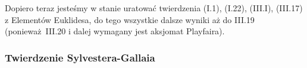 Dopiero teraz jesteśmy w stanie uratować twierdzenia (I.1), (I.22), (III.I), (III.17) z Elementów Euklidesa, do tego wszystkie dalsze wyniki aż do III.19 (ponieważ III.20 i dalej wymagany jest aksjomat Playfaira).


\subsubsection{Twierdzenie Sylvestera-Gallaia}
